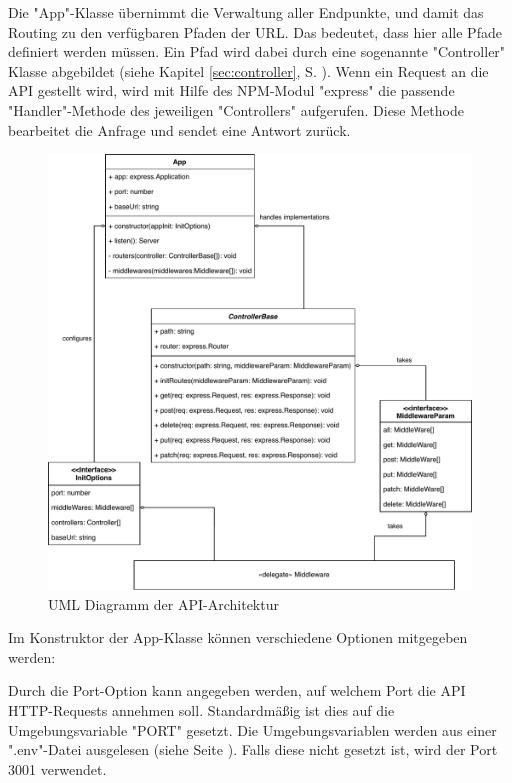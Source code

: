 \label{sec:app}

Die "App"-Klasse übernimmt die Verwaltung aller Endpunkte, und damit das Routing zu den verfügbaren Pfaden der URL. Das bedeutet, dass hier alle Pfade definiert werden müssen. Ein Pfad wird dabei durch eine sogenannte "Controller" Klasse abgebildet (siehe Kapitel \ref{sec:controller}, S. \pageref{sec:controller}). Wenn ein Request an die API gestellt wird, wird mit Hilfe des NPM-Modul "express" die passende "Handler"-Methode des jeweiligen "Controllers" aufgerufen. Diese Methode bearbeitet die Anfrage und sendet eine Antwort zurück.

\begin{figure}[H]
    \centering
    \includegraphics[width=\textwidth]{media/APITemplate/apiArchitecture.svg.pdf}
    \caption{UML Diagramm der API-Architektur}
    \label{fig:apiUML}
\end{figure}

\pagebreak

\label{sec:appConstructor}

Im Konstruktor der App-Klasse können verschiedene Optionen mitgegeben werden:


Durch die Port-Option kann angegeben werden, auf welchem Port die API HTTP-Requests annehmen soll. Standardmäßig ist dies auf die Umgebungsvariable "PORT" gesetzt. Die Umgebungsvariablen werden aus einer ".env"-Datei ausgelesen (siehe Seite \pageref{par:dockerEnvFile}). Falls diese nicht gesetzt ist, wird der Port 3001 verwendet.

